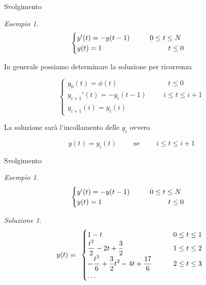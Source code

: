 \documentclass[intlimits]{beamer}
\numberwithin{equation}{section}
\theoremstyle{plain}
\theoremstyle{definition}
\theoremstyle{remark}
\newtheorem{esempio}[teor]{Esempio}
\newtheorem{soluzione}[teor]{Soluzione}
\begin{document}
\begin{frame}{Svolgimento}
\begin{esempio}
$$
\begin{cases}
 y'(t)=-y(t-1)	\hspace{1cm}		0 \le 	t \le N			\\
 y(t)=1		\hspace{3.3cm}			t \le 0
\end{cases}
$$
\end{esempio}

\pause
In generale possiamo determinare la soluzione per ricorrenza


\begin{block}{}
$$
\begin{cases}
y_0(t)		=	\phi(t)			\hspace{3cm}	t \le 0			\\
y_{i+1}'(t)	=	-y_i(t-1)		\hspace{1cm}	i \le t \le i+1		\\
y_{i+1}(i)	=	y_i(i)
\end{cases}
$$
\end{block}

\pause

La soluzione sarà l'incollamento delle $y_i$ ovvero
\pause
\begin{block}{}
$$
y(t)=y_i(t)	\hspace{1cm}	\mbox{se}	\hspace{1cm}	i \le t \le i+1
$$
\end{block}


\end{frame}

\begin{frame}{Svolgimento}
 \begin{esempio}
$$
\begin{cases}
 y'(t)=-y(t-1)	\hspace{1cm}		0 \le 	t \le N			\\
 y(t)=1		\hspace{3.3cm}			t \le 0
\end{cases}
$$
\end{esempio}

\begin{soluzione}
 $$
y(t)=
\begin{array}{lc lc}
\begin{cases}
\displaystyle
1-t												&	\hspace{0.7cm}	0 \le t \le 1	\\
\displaystyle
\frac{t^2}{2}-2t+\frac{3}{2}									&	\hspace{0.7cm}	1 \le t \le 2	\\
\displaystyle
-\frac{t^3}{6}+\frac{3}{2}t^2-4t+\frac{17}{6}							&	\hspace{0.7cm}	2 \le t \le 3	\\
\dots
\end{cases}
\end{array}
$$
\end{soluzione}
\end{frame}
\end{document}
